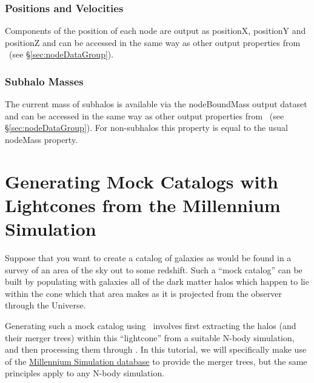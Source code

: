\subsubsection{Positions and Velocities}

Components of the position of each node are output as {\normalfont \ttfamily positionX}, {\normalfont \ttfamily positionY} and {\normalfont \ttfamily positionZ} and can be accessed in the same way as other output properties from \glc\ (see \S\ref{sec:nodeDataGroup}).

\subsubsection{Subhalo Masses}

The current mass of subhalos is available via the {\normalfont \ttfamily nodeBoundMass} output dataset and can be accessed in the same way as other output properties from \glc\ (see \S\ref{sec:nodeDataGroup}). For non-subhalos this property is equal to the usual {\normalfont \ttfamily nodeMass} property.

\section{Generating Mock Catalogs with Lightcones from the Millennium Simulation}

Suppose that you want to create a catalog of galaxies as would be found in a survey of an area of the sky out to some redshift. Such a ``mock catalog'' can be built by populating with galaxies all of the dark matter halos which happen to lie within the cone which that area makes as it is projected from the observer through the Universe.

Generating such a mock catalog using \glc\ involves first extracting the halos (and their merger trees) within this ``lightcone'' from a suitable N-body simulation, and then processing them through \glc. In this tutorial, we will specifically make use of the \href{http://gavo.mpa-garching.mpg.de/MyMillennium3/MyDB}{Millennium Simulation database} to provide the merger trees, but the same principles apply to any N-body simulation.

